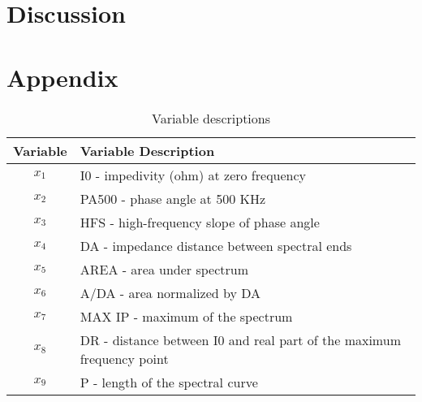 \documentclass[12pt,letterpaper]{report}
\begin{document}
%
%

\section*{Discussion}





\pagebreak



\pagebreak
\appendix
\section*{Appendix}
\begin{table}[htpb!]
\caption{Variable descriptions}
\label{tab1:dta_vars}
\begin{center}
 \begin{tabular}{||c l||}
 \hline
Variable & Variable Description \\ [0.5ex] 
 \hline\hline
 $x_{1}$ & I0 - impedivity (ohm) at zero frequency \\ 
 \hline
 $x_{2}$ & 	PA500 - phase angle at 500 KHz \\
 \hline
 $x_{3}$ & HFS - high-frequency slope of phase angle \\
 \hline
 $x_{4}$ & DA - impedance distance between spectral ends \\
 \hline
 $x_{5}$ & AREA - area under spectrum \\
 \hline
 $x_{6}$ & 	A/DA - area normalized by DA \\
 \hline
 $x_{7}$ & MAX IP - maximum of the spectrum \\
 \hline
 $x_{8}$ & 	DR - distance between I0 and real part of the maximum frequency point \\
 \hline
 $x_{9}$ & P - length of the spectral curve \\ [1ex] 
 \hline
\end{tabular}
\end{center}
\end{table}
\end{document}
